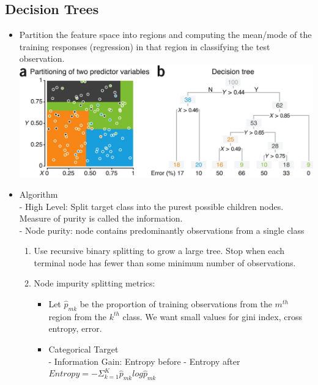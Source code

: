 \documentclass{article}
\begin{document}
\begin{multicols*}{3}
        \section{Decision Trees}
    \renewcommand\labelitemi{{\boldmath$\cdot$}}
    \begin{itemize}[noitemsep]
        \item Partition the feature space into regions and computing the 
        mean/mode of the training responses (regression) in that region 
        in classifying the test observation. \\
        \includegraphics[width=\linewidth]{cart_chart}
        \item Algorithm \\
        - High Level: Split target class into the purest possible 
        children nodes. Measure of purity is called the information. \\
        - Node purity: node contains predominantly observations 
        from a single class
        \begin{enumerate}
            \item Use recursive binary splitting to grow a large tree. 
            Stop when each terminal node has fewer than some minimum 
            number of observations.
            \item Node impurity splitting metrics:
                \begin{itemize}
                    \item Let $\hat{p}_{mk}$ be the proportion of 
                    training observations from the $m^{th}$ region 
                    from the $k^{th}$ class. We want small values 
                    for gini index, cross entropy, error.
                    \item Categorical Target \\
                    - Information Gain: Entropy before - Entropy after \\
                    $Entropy= -\Sigma_{k=1}^K\hat{p}_{mk}log\hat{p}_{mk}$ \\

\end{itemize}
\end{enumerate}
\end{itemize}
\end{multicols*}
\end{document}
